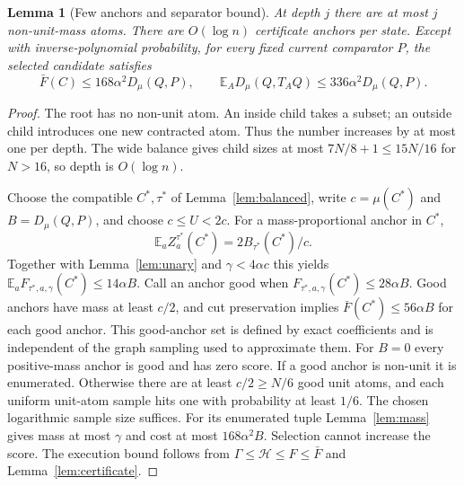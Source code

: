 \documentclass[11pt]{article}
\newtheorem{lemma}[theorem]{Lemma}
\theoremstyle{definition}
\newcommand{\E}{\mathbb E}
\begin{document}
\begin{lemma}[Few anchors and separator bound]\label{lem:fast-separator}
At depth $j$ there are at most $j$ non-unit-mass atoms.
There are $O(\log n)$ certificate anchors per state. Except with
inverse-polynomial probability, for every fixed current comparator $P$,
the selected candidate satisfies
\[
 \bar F(C)\le168\alpha^2D_\mu(Q,P),\qquad
 \E_A D_\mu(Q,T_AQ)\le336\alpha^2D_\mu(Q,P).
\]
\end{lemma}
\begin{proof}
The root has no non-unit atom. An inside child takes a subset; an outside
child introduces one new contracted atom. Thus the number increases
by at most one per depth. The wide balance gives child sizes at most
$7N/8+1\le15N/16$ for $N>16$, so depth is $O(\log n)$.

Choose the compatible $C^*,\tau^*$ of Lemma~\ref{lem:balanced}, write
$c=\mu(C^*)$ and $B=D_\mu(Q,P)$, and choose $c\le U<2c$.
For a mass-proportional anchor in $C^*$,
\[
 \E_a Z^{\tau^*}_a(C^*)=2B_{\tau^*}(C^*)/c.
\]
Together with Lemma~\ref{lem:unary} and $\gamma<4\alpha c$ this yields
$\E_a F_{\tau^*,a,\gamma}(C^*)\le14\alpha B$.
Call an anchor good when $F_{\tau^*,a,\gamma}(C^*)\le28\alpha B$.
Good anchors have mass at least $c/2$, and cut preservation implies
$\bar F(C^*)\le56\alpha B$ for each good anchor. This good-anchor
set is defined by exact coefficients and is independent of the graph
sampling used to approximate them. For $B=0$ every positive-mass
anchor is good and has zero score.
If a good anchor is non-unit it is enumerated. Otherwise there are at
least $c/2\ge N/6$ good unit atoms, and each uniform unit-atom sample
hits one with probability at least $1/6$.
The chosen logarithmic sample size suffices.
For its enumerated tuple Lemma~\ref{lem:mass} gives mass at most $\gamma$
and cost at most $168\alpha^2B$. Selection cannot increase the score.
The execution bound follows from
$\Gamma\le\mathcal H\le F\le\bar F$ and
Lemma~\ref{lem:certificate}.
\end{proof}
\end{document}

